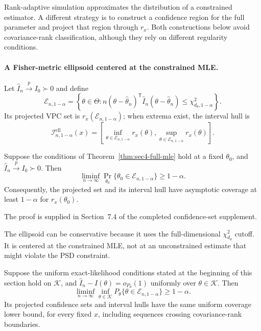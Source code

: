 Rank-adaptive simulation approximates the distribution of a
constrained estimator. A different strategy is to construct a
confidence region for the full parameter and project that region
through $r_x$. Both constructions below avoid covariance-rank
classification, although they rely on different regularity conditions.

\paragraph{A Fisher-metric ellipsoid centered at the constrained MLE.}
Let $\widehat I_n\xrightarrow{p}I_0\succ0$ and define
\begin{equation}\label{eq:sec8-ellipsoid}
\mathcal E_{n,1-\alpha}
=\left\{\theta\in\Theta:
 n(\theta-\widehat\theta_n)^{\mathsf T}
 \widehat I_n(\theta-\widehat\theta_n)
 \le\chi^2_{d_\theta,1-\alpha}\right\}.
\end{equation}
Its projected VPC set is $r_x(\mathcal E_{n,1-\alpha})$;
when extrema exist, the interval hull is
\begin{equation}\label{eq:sec8-ellipsoid-interval}
\mathcal I_{n,1-\alpha}^{\mathrm{ell}}(x)
=\left[
\inf_{\theta\in\mathcal E_{n,1-\alpha}}r_x(\theta),
\sup_{\theta\in\mathcal E_{n,1-\alpha}}r_x(\theta)
\right].
\end{equation}

\begin{proposition}
\label{prop:sec8-ellipsoid-coverage}
Suppose the conditions of Theorem~\ref{thm:sec4-full-mle}
hold at a fixed $\theta_0$, and
$\widehat I_n\xrightarrow{p}I_0\succ0$. Then
\begin{equation}\label{eq:sec8-ellipsoid-coverage}
\liminf_{n\to\infty}
\Pr_{\theta_0}\{\theta_0\in\mathcal E_{n,1-\alpha}\}
\ge1-\alpha.
\end{equation}
Consequently, the projected set and its interval hull have
asymptotic coverage at least $1-\alpha$ for $r_x(\theta_0)$.
\end{proposition}

The proof is supplied in Section~7.4 of the completed confidence-set supplement.


The ellipsoid can be conservative because it uses the full-dimensional
$\chi_{d_\theta}^2$ cutoff. It is centered at the constrained MLE,
not at an unconstrained estimate that might violate the PSD constraint.

\begin{theorem}
\label{thm:sec8-ellipsoid-uniform}
Suppose the uniform exact-likelihood conditions stated at the beginning
of this section hold on $\mathcal K$, and
$\widehat I_n-I(\theta)=o_{P_\theta}(1)$ uniformly over
$\theta\in\mathcal K$. Then
\begin{equation}\label{eq:sec8-ellipsoid-uniform}
\liminf_{n\to\infty}\inf_{\theta\in\mathcal K}
P_\theta\{\theta\in\mathcal E_{n,1-\alpha}\}\ge 1-\alpha.
\end{equation}
Its projected confidence sets and interval hulls have the same
uniform coverage lower bound, for every fixed $x$, including
sequences crossing covariance-rank boundaries.
\end{theorem}

